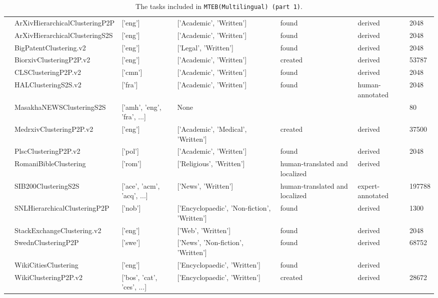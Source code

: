 \begin{table*}[!htb]
{\begin{tabular}{lllllll}
     & ArXivHierarchicalClusteringP2P  & ['eng'] & ['Academic', 'Written'] & found & derived & 2048 \\
     & ArXivHierarchicalClusteringS2S  & ['eng'] & ['Academic', 'Written'] & found & derived & 2048 \\
     & BigPatentClustering.v2 \cite{DBLP:journals/corr/abs-1906-03741} & ['eng'] & ['Legal', 'Written'] & found & derived & 2048 \\
     & BiorxivClusteringP2P.v2  & ['eng'] & ['Academic', 'Written'] & created & derived & 53787 \\
     & CLSClusteringP2P.v2 \cite{li2022csl} & ['cmn'] & ['Academic', 'Written'] & found & derived & 2048 \\
     & HALClusteringS2S.v2 \cite{ciancone2024extending} & ['fra'] & ['Academic', 'Written'] & found & human-annotated & 2048 \\
     & MasakhaNEWSClusteringS2S \cite{adelani2023masakhanews} & ['amh', 'eng', 'fra', ...] & None & & & 80 \\
     & MedrxivClusteringP2P.v2  & ['eng'] & ['Academic', 'Medical', 'Written'] & created & derived & 37500 \\
     & PlscClusteringP2P.v2  & ['pol'] & ['Academic', 'Written'] & found & derived & 2048 \\
     & RomaniBibleClustering  & ['rom'] & ['Religious', 'Written'] & human-translated and localized & derived &  \\
     & SIB200ClusteringS2S \cite{adelani2023sib} & ['ace', 'acm', 'acq', ...] & ['News', 'Written'] & human-translated and localized & expert-annotated & 197788 \\
     & SNLHierarchicalClusteringP2P \cite{navjord2023beyond} & ['nob'] & ['Encyclopaedic', 'Non-fiction', 'Written'] & found & derived & 1300 \\
     & StackExchangeClustering.v2 \cite{geigle:2021:arxiv} & ['eng'] & ['Web', 'Written'] & found & derived & 2048 \\
     & SwednClusteringP2P \cite{monsen2021method} & ['swe'] & ['News', 'Non-fiction', 'Written'] & found & derived & 68752 \\
     & WikiCitiesClustering \cite{wikidump} & ['eng'] & ['Encyclopaedic', 'Written'] & found & derived &  \\
     & WikiClusteringP2P.v2  & ['bos', 'cat', 'ces', ...] & ['Encyclopaedic', 'Written'] & created & derived & 28672 \\
\bottomrule
\end{tabular}
}
\caption{The tasks included in \texttt{MTEB(Multilingual) (part 1)}.}
\label{tab:mteb_multilingual_task_overview1}
\end{table*}


